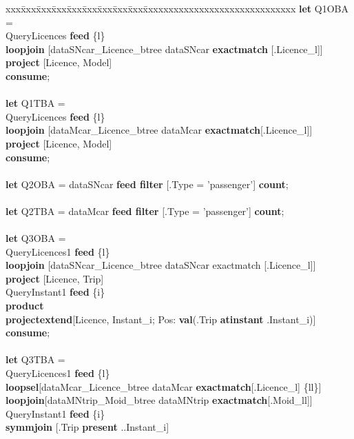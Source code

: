 \documentclass[a4paper]{article}
\newcommand{\op}[1]{\textbf{#1}}
\begin{document}
\begin{scriptsize}
\begin{tabbing}
xxx\=xxx\=xxx\=xxx\=xxx\=xxx\=xxx\=xxx\=xxx\=xxxxxxxxxxxxxxxxxxxxxxxxxxxxxx\kill
\op{let} Q1OBA =\\
\>QueryLicences \op{feed} \{l\}\\
\>\>\op{loopjoin} [dataSNcar\_Licence\_btree dataSNcar \op{exactmatch} [.Licence\_l]]\\
\>\>\op{project} [Licence, Model]\\
\op{consume};\\
\\
\op{let} Q1TBA =\\
\>QueryLicences \op{feed} \{l\}\\
\>\>\op{loopjoin} [dataMcar\_Licence\_btree dataMcar \op{exactmatch}[.Licence\_l]]\\
\>\>\op{project} [Licence, Model]\\
\op{consume};\\
\\
\op{let} Q2OBA = dataSNcar \op{feed filter} [.Type = 'passenger'] \op{count};\\
\\
\op{let} Q2TBA = dataMcar \op{feed filter} [.Type = 'passenger'] \op{count};\\
\\
\op{let} Q3OBA =\\
\>QueryLicences1 \op{feed} \{l\}\\
\>\>\op{loopjoin} [dataSNcar\_Licence\_btree dataSNcar exactmatch [.Licence\_l]]\\
\>\>\op{project} [Licence, Trip]\\
\>QueryInstant1 \op{feed} \{i\}\\
\>\op{product}\\
\>\op{projectextend}[Licence, Instant\_i; Pos: \op{val}(.Trip \op{atinstant} .Instant\_i)]\\
\op{consume};\\
\\
\op{let} Q3TBA =\\
\>QueryLicences1 \op{feed} \{l\}\\
\>\>\op{loopsel}[dataMcar\_Licence\_btree dataMcar \op{exactmatch}[.Licence\_l] \{ll\}]\\
\>\>\op{loopjoin}[dataMNtrip\_Moid\_btree dataMNtrip
\op{exactmatch}[.Moid\_ll]]\\
\>QueryInstant1 \op{feed} \{i\}\\
\>\op{symmjoin} [.Trip \op{present} ..Instant\_i]\\

\end{tabbing}
\end{scriptsize}
\end{document}
